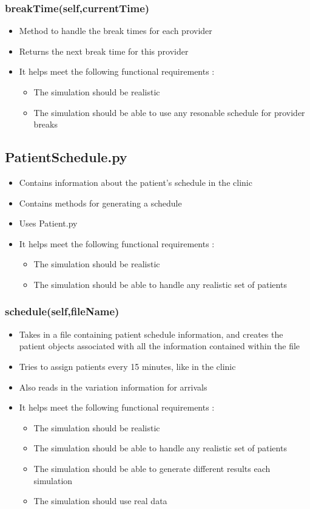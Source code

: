 \documentclass[12pt]{article}
\begin{document}
\subsubsection{breakTime(self,currentTime)}
\begin{itemize}
	\item Method to handle the break times for each provider
	\item Returns the next break time for this provider
	\item It helps meet the following functional requirements :
	\begin{itemize}
		\item The simulation should be realistic
		\item The simulation should be able to use any resonable schedule for provider breaks
	\end{itemize}
\end{itemize}
\subsection{PatientSchedule.py}
\begin{itemize}  
\item Contains information about the patient's schedule in the clinic
\item Contains methods for generating a schedule 
\item Uses Patient.py
\item It helps meet the following functional requirements :
\begin{itemize}
	\item The simulation should be realistic
	\item The simulation should be able to handle any realistic set of patients
\end{itemize}
\end{itemize}
\subsubsection{schedule(self,fileName)}
\begin{itemize}
	\item Takes in a file containing patient schedule information, and creates the patient objects associated with all the information contained within the file
	\item Tries to assign patients every 15 minutes, like in the clinic
	\item Also reads in the variation information for arrivals
	\item It helps meet the following functional requirements :
	\begin{itemize}
		\item The simulation should be realistic
		\item The simulation should be able to handle any realistic set of patients
		\item The simulation should be able to generate different results each simulation
		\item The simulation should use real data
	\end{itemize}
\end{itemize}
\end{document}
